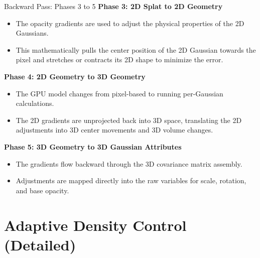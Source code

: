 \begin{frame}{Backward Pass: Phases 3 to 5}
    \textbf{Phase 3: 2D Splat to 2D Geometry}
    \begin{itemize}
        \justifying
        \item The opacity gradients are used to adjust the physical properties of the 2D Gaussians.
        \item This mathematically pulls the center position of the 2D Gaussian towards the pixel and stretches or contracts its 2D shape to minimize the error.
    \end{itemize}

    \pause
    \vspace{1em}

    \textbf{Phase 4: 2D Geometry to 3D Geometry}
    \begin{itemize}
        \justifying
        \item The GPU model changes from pixel-based to running per-Gaussian calculations.
        \item The 2D gradients are unprojected back into 3D space, translating the 2D adjustments into 3D center movements and 3D volume changes.
    \end{itemize}

    \pause
    \vspace{1em}

    \textbf{Phase 5: 3D Geometry to 3D Gaussian Attributes}
    \begin{itemize}
        \justifying
        \item The gradients flow backward through the 3D covariance matrix assembly.
        \item Adjustments are mapped directly into the raw variables for scale, rotation, and base opacity.
    \end{itemize}

\end{frame}

\section{Adaptive Density Control (Detailed)}

